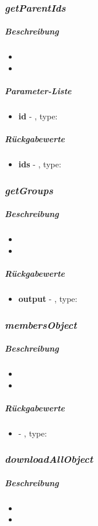 \subsubsection*{\textit{getParentIds}}\label{getParentIdsTGUI}
\subparagraph{Beschreibung}
\begin{itemize}
	\item[] \noindent{}
	\item[]  
\end{itemize}
\subparagraph{Parameter-Liste}
\begin{itemize}
	\item[] \textbf{id} - , type: 
\end{itemize}
\subparagraph{Rückgabewerte}
\begin{itemize}
	\item[] \textbf{ids} - , type: 
\end{itemize}

\subsubsection*{\textit{getGroups}}\label{getGroupsTGUI}
\subparagraph{Beschreibung}
\begin{itemize}
	\item[] \noindent{}
	\item[] 
\end{itemize}
\subparagraph{Rückgabewerte}
\begin{itemize}
	\item[] \textbf{output} - , type: 
\end{itemize}


\subsubsection*{\textit{membersObject}}\label{membersObjectTGUI}
\subparagraph{Beschreibung}
\begin{itemize}
	\item[] \noindent{}
	\item[] 
\end{itemize}
\subparagraph{Rückgabewerte}
\begin{itemize}
	\item[] \textbf{} - , type: 
\end{itemize}

\subsubsection*{\textit{downloadAllObject}}\label{downloadAllObjectTGUI}
\subparagraph{Beschreibung}
\begin{itemize}
	\item[] \noindent{}
	\item[] 
\end{itemize}


